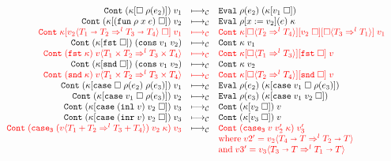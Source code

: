 \documentclass[acmsmall,review,anonymous]{acmart}\settopmatter{printfolios=true,printccs=false,printacmref=false}
\newcommand{\plus}[0]{+}
\newcommand{\sOOinspect}[3]{\mathtt{Eval} \; #2(#1) \; #3}
\newcommand{\sOOreturn}[2]{\mathtt{Cont} \; #2 \; #1}
\newcommand{\POOfun}[2]{#1 \shortrightarrow #2}
\newcommand{\POOprod}[2]{#1 \times #2}
\newcommand{\POOsum}[2]{#1 \plus #2}
\newcommand{\cOOcast}[3]{#1 \Rightarrow^{#2} #3}
\newcommand{\vOOcast}[2]{#1\langle#2\rangle}
\newcommand{\vOOfun}[3]{\mathtt{fun} \; #1 \; #2 \; #3}
\newcommand{\vOOcons}[2]{\mathtt{cons}\;#1\;#2}
\newcommand{\vOOinl}[1]{\mathtt{inl}\;#1}
\newcommand{\vOOinr}[1]{\mathtt{inr}\;#1}
\newcommand{\kOOappI}[3]{
	#3[\square \; #2(#1) ]
}
\newcommand{\kOOappII}[2]{
	#2[#1 \; \square]}
\newcommand{\kOOcar}[1]{#1[\mathtt{fst} \; \square]}
\newcommand{\kOOcdr}[1]{#1[\mathtt{snd} \; \square]}
\newcommand{\kOOcaseI}[4]{
	#4[\mathtt{case} \; \square \; #3(#1) \; #3(#2) ]}
\newcommand{\kOOcaseII}[4]{
	#4[\mathtt{case} \; #1 \; \square \; #3(#2) ]}
\newcommand{\kOOcaseIII}[3]{
	#3[\mathtt{case} \; #1 \; #2 \; \square]}
\newcommand{\kOOcast}[2]{
	#2[\square \langle #1 \rangle]}
\newcommand{\redrule}[3]{#1 & \longmapsto_\mathcal{C} & #2 & #3\\}
\newcommand{\hiredrule}[3]{\highlight{#1} & \highlight{\longmapsto_\mathcal{C}} & \highlight{#2} & \highlight{#3} \\}
\newcommand{\highlight}[1]{{\color{red} #1}}
\begin{document}
\begin{figure}
\[\begin{array}{rclr}
\redrule{
\sOOreturn{v_1}{(\kOOappI{e_2}{\rho}{\kappa})}}{
\sOOinspect{e_2}{\rho}{(\kOOappII{v_1}{\kappa})}}{}

\redrule{
\sOOreturn{v_2}{(\kOOappII{(\vOOfun{\rho}{x}{e})}{\kappa})}}{
\sOOinspect{e}{\rho[x:=v_2]}{\kappa}}{}
	\hiredrule{
		\sOOreturn{v_1}{
			\kOOappII{\vOOcast{v_2}{
					\cOOcast{\POOfun{T_1}{T_2}}{l}{\POOfun{T_3}{T_4}}
			}}{\kappa}
		}
	}{
		\sOOreturn{v_1}{
			\kOOcast{\cOOcast{T_3}{l}{T_1}}{
				\kOOappII{v_2}{
					\kOOcast{\cOOcast{T_2}{l}{T_4}}{\kappa}
				}
			}
		}
	}{}
	\redrule{
	\sOOreturn{
		(\vOOcons{v_1}{v_2})
	}{(\kOOcar{\kappa})}
	}{
	\sOOreturn{v_1}{\kappa}
	}{}
	\hiredrule{
		\sOOreturn{
			\vOOcast{v}{\cOOcast{\POOprod{T_1}{T_2}}{l}{
					\POOprod{T_3}{T_4}}}
		}{(\mathtt{fst} \; \kappa)}
	}{
		\sOOreturn{v}{
			\kOOcar{
				\kOOcast{\cOOcast{T_1}{l}{T_3}}{\kappa}
			}}
	}{}
	\redrule{
	\sOOreturn{
		(\vOOcons{v_1}{v_2})
	}{(\kOOcdr{\kappa})}
	}{
	\sOOreturn{v_2}{\kappa}
	}{}
	
	\hiredrule{
		\sOOreturn{
			\vOOcast{v}{\cOOcast{\POOprod{T_1}{T_2}}{l}{
					\POOprod{T_3}{T_4}}}
		}{(\mathtt{snd} \; \kappa)}
	}{
		\sOOreturn{v}{
			\kOOcdr{\kOOcast{\cOOcast{T_2}{l}{T_4}}{\kappa}}}
	}{}

\redrule{
\sOOreturn{v_1}{(\kOOcaseI{e_2}{e_3}{\rho}{\kappa})}}{
\sOOinspect{e_2}{\rho}{(\kOOcaseII{v_1}{e_3}{\rho}{\kappa})}}{}

\redrule{
\sOOreturn{v_2}{(\kOOcaseII{v_1}{e_3}{\rho}{\kappa})}}{
\sOOinspect{e_3}{\rho}{
	(\kOOcaseIII{v_1}{v_2}{\kappa})
}}{}	

\redrule{
\sOOreturn{v_3}{
	(\kOOcaseIII{(\vOOinl{v})}{v_2}{\kappa})
}
}{
\sOOreturn{v}{(\kOOappII{v_2}{\kappa})}
}{}

\redrule{
	\sOOreturn{v_3}{
		(\kOOcaseIII{(\vOOinr{v})}{v_2}{\kappa})
	}
}{
\sOOreturn{v}{(\kOOappII{v_3}{\kappa})}
}{}

\redrule{
	\highlight{\sOOreturn{v_3}{(\mathtt{case_3}\;
		(\vOOcast{v}{\cOOcast{\POOsum{T_1}{T_2}}{l}{\POOsum{T_3}{T_4}}})
		\;v_2\;\kappa)}}
}{
	\highlight{\sOOreturn{v_3'}{
		(\mathtt{case_3}\;v
		\;v_2'\;\kappa)
	}}
}{\\&&
\highlight{\text{where}\;
v2' = \vOOcast{v_2}{\cOOcast{\POOfun{T_4}{T}}{l}{\POOfun{T_2}{T}}}}
\\&&
\highlight{\text{and}\;
v3' = \vOOcast{v_3}{\cOOcast{\POOfun{T_3}{T}}{l}{\POOfun{T_1}{T}}}}
}
	

\end{array}\]
\end{figure}
\end{document}

